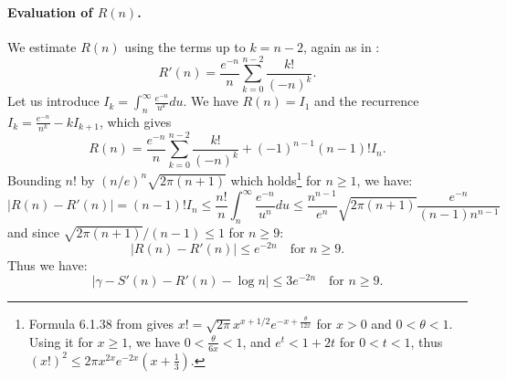 \documentclass[12pt]{amsart}
\def\exp{{\rm EXP}}
\begin{document}
\paragraph{Evaluation of $R(n)$.}
We estimate $R(n)$ using the terms up to $k=n-2$, again 
as in \cite{Brent78}:
\[ R'(n) = \frac{e^{-n}}{n} \sum_{k=0}^{n-2} \frac{k!}{(-n)^k}. \]
Let us introduce $I_k = \int_n^{\infty} \frac{e^{-u}}{u^k} du$.
We have $R(n) = I_1$ and the recurrence $I_k = \frac{e^{-n}}{n^k} - k I_{k+1}$,
which gives
\[ R(n) = \frac{e^{-n}}{n} \sum_{k=0}^{n-2} \frac{k!}{(-n)^k}
        + (-1)^{n-1} (n-1)! I_n. \]
Bounding $n!$ by $(n/e)^n \sqrt{2 \pi (n+1)}$ which holds\footnote{
Formula 6.1.38 from \cite{AbSt73} gives
$x! = \sqrt{2\pi} x^{x+1/2} e^{-x+\frac{\theta}{12x}}$ for $x>0$ and
$0 < \theta < 1$.
Using it for $x \ge 1$, we have $0 < \frac{\theta}{6x} < 1$, and
$e^t < 1+2t$ for $0 < t < 1$, thus 
$(x!)^2 \le 2\pi x^{2x} e^{-2x} (x+\frac{1}{3})$.}
for $n \ge 1$, we have:
\[ |R(n) - R'(n)| = (n-1)! I_n 
        \le \frac{n!}{n} \int_n^{\infty} \frac{e^{-n}}{u^n} du
        \le \frac{n^{n-1}}{e^n} \sqrt{2 \pi (n+1)} \frac{e^{-n}}{(n-1) 
        n^{n-1}} \]
and since $\sqrt{2 \pi (n+1)}/(n-1) \le 1$ for $n \ge 9$:
\[ |R(n) - R'(n)| \le e^{-2n} \quad \mbox{for $n \ge 9$}. \]
Thus we have:
\[ |\gamma - S'(n) - R'(n) - \log n| \le 3 e^{-2n} \quad \mbox{for $n\ge 9$}.\]
\end{document}
